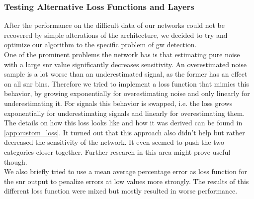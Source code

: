 \subsubsection{Testing Alternative Loss Functions and Layers}
After the performance on the difficult data of our networks could not be recovered by simple alterations of the architecture, we decided to try and optimize our algorithm to the specific problem of \gls{gw} detection.\smallskip\\
One of the prominent problems the network has is that estimating pure noise with a large \gls{snr} value significantly decreases sensitivity. An overestimated noise sample is a lot worse than an underestimated signal, as the former has an effect on all \gls{snr} bins. Therefore we tried to implement a loss function that mimics this behavior, by growing exponentially for overestimating noise and only linearly for underestimating it. For signals this behavior is swapped, i.e. the loss grows exponentially for underestimating signals and linearly for overestimating them. The details on how this loss looks like and how it was derived can be found in \autoref{app:custom_loss}. It turned out that this approach also didn't help but rather decreased the sensitivity of the network. It even seemed to push the two categories closer together. Further research in this area might prove useful though.\smallskip\\
We also briefly tried to use a mean average percentage error as loss function for the \gls{snr} output to penalize errors at low values more strongly. The results of this different loss function were mixed but mostly resulted in worse performance.\medskip\\
